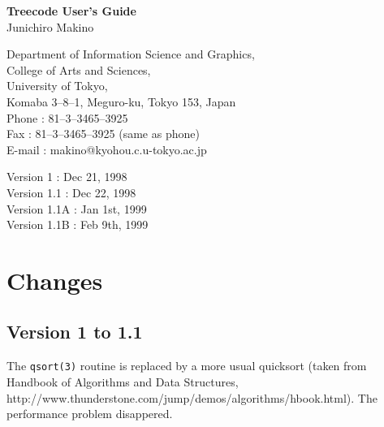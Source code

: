 %



\begin{center}
{\Large\bf Treecode User's Guide}\\
\bigskip
{\large Junichiro Makino}\\
\bigskip

Department of Information Science and Graphics,\\
College of Arts and Sciences,\\
University of Tokyo,\\
Komaba 3--8--1, Meguro-ku, Tokyo 153, Japan\\
Phone : 81--3--3465--3925\\
Fax : 81--3--3465--3925 (same as phone)\\
E-mail : makino@kyohou.c.u-tokyo.ac.jp\\
\end{center}

\begin{center}
Version 1 : Dec 21, 1998\\
Version 1.1 : Dec 22, 1998\\
Version 1.1A : Jan 1st, 1999\\
Version 1.1B : Feb 9th, 1999\\
\end{center}

\def\nbody{{\tt nbody}}
\def\vcode{{\tt v\_code}}
\bigskip
\begin{abstract}

This guide gives a brief desciption of the program \nbody, a C++
version of treecode and its GRAPE-4 variant.
\end{abstract}


\section{Changes}

\subsection{Version 1 to 1.1}

The {\tt qsort(3)} routine is replaced by a more usual quicksort
(taken from Handbook of Algorithms and Data Structures,
http://www.thunderstone.com/jump/demos/algorithms/hbook.html). The
performance problem disappered. 

